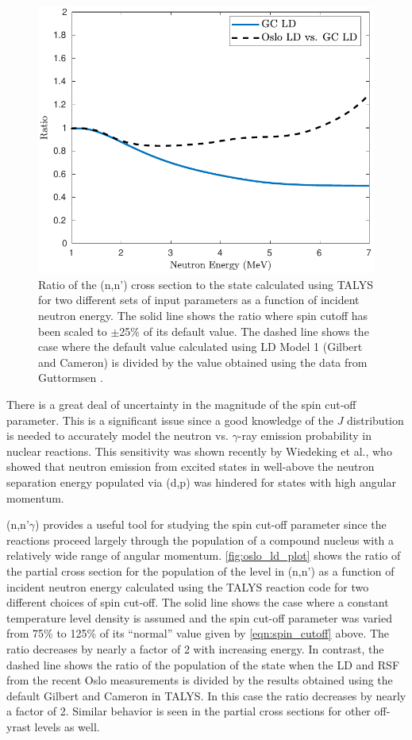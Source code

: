 \documentclass[letterpaper]{ar-1col}
\begin{document}
\begin{figure}
 \centering
 \includegraphics[width=0.55\linewidth]{fig3.pdf}

 \caption{Ratio of the (n,n') cross section to the state calculated using TALYS for two different sets of input parameters as a function of incident neutron energy.
The solid line shows the ratio where spin cutoff has been scaled to $\pm$25\% of its default value.
The dashed line shows the case where the default value calculated using LD Model 1 (Gilbert and Cameron) is divided by the value obtained using the data from Guttormsen \cite{Gut13a}.}
 \label{fig:oslo_ld_plot}
\end{figure}

There is a great deal of uncertainty in the magnitude of the spin cut-off parameter.
 This is a significant issue since a good knowledge of the $J$ distribution is needed to accurately model the neutron vs. $\gamma$-ray emission probability in nuclear reactions.
 This sensitivity was shown recently by Wiedeking et al., \cite{Wie16} who showed that neutron emission from excited states in  well-above the neutron separation energy populated via (d,p) was hindered for states with high angular momentum.






(n,n'$\gamma$) provides a useful tool for studying the spin cut-off parameter since the reactions proceed largely through the population of a compound nucleus with a relatively wide range of angular momentum.
\autoref{fig:oslo_ld_plot} shows the ratio of the partial cross section for the population of the  level in (n,n') as a function of incident neutron energy calculated using the TALYS reaction code for two different choices of spin cut-off.
 The solid line shows the case where a constant temperature level density is assumed and the spin cut-off parameter was varied from 75\% to 125\% of its \enquote{normal} value given by \autoref{eqn:spin_cutoff} above.
 The ratio decreases by nearly a factor of 2 with increasing energy.
 In contrast, the dashed line shows the ratio of the  population of the  state when the LD and RSF from the recent Oslo measurements \cite{Gut13a} is divided by the results obtained using the default Gilbert and Cameron in TALYS.
 In this case the ratio decreases by nearly a factor of 2.
 Similar behavior is seen in the partial cross sections for other off-yrast levels as well.
\end{document}

